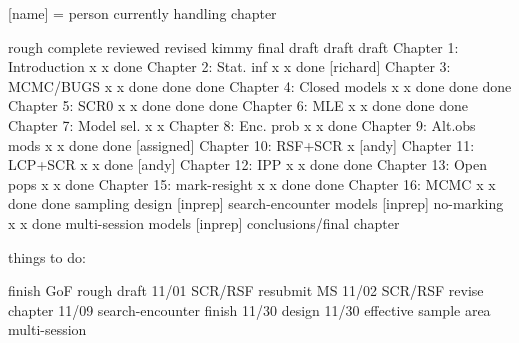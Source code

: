 [name] = person currently handling chapter


                          rough   complete reviewed  revised kimmy final 
                          draft    draft                           draft
Chapter 1: Introduction       x       x     done    
Chapter 2: Stat. inf          x       x     done    [richard]
Chapter 3: MCMC/BUGS          x       x     done     done    done
Chapter 4: Closed models      x       x     done     done    done
Chapter 5: SCR0               x       x     done     done    done
Chapter 6: MLE                x       x     done     done    done
Chapter 7: Model sel.         x       x    
Chapter 8: Enc. prob          x       x     done
Chapter 9: Alt.obs mods       x       x     done     done   [assigned]
Chapter 10: RSF+SCR           x    [andy]
Chapter 11: LCP+SCR           x       x     done    [andy]
Chapter 12: IPP               x       x     done     done       
Chapter 13: Open pops         x       x     done 
Chapter 15: mark-resight      x       x     done     done 
Chapter 16: MCMC              x       x     done     done
sampling design            [inprep]
search-encounter models    [inprep]
no-marking                    x       x     done
multi-session models       [inprep]
conclusions/final chapter





things to do:

finish GoF rough draft   11/01
SCR/RSF resubmit MS      11/02
SCR/RSF revise chapter   11/09
search-encounter finish  11/30
design                   11/30
effective sample area  
multi-session
